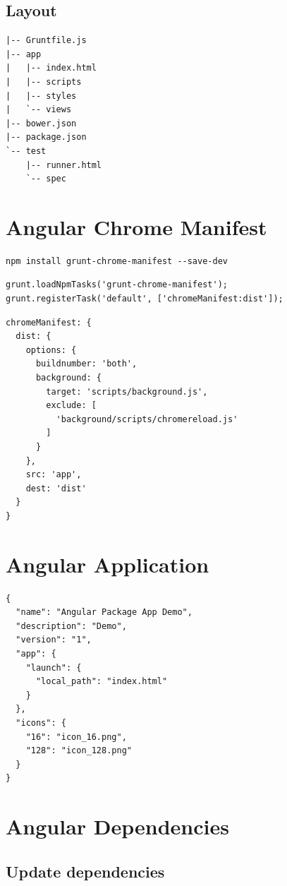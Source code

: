 \documentclass[11pt]{article}
\begin{document}
\subsection*{Layout}
\label{sec-11-2}

\begin{verbatim}
|-- Gruntfile.js
|-- app
|   |-- index.html
|   |-- scripts
|   |-- styles
|   `-- views
|-- bower.json
|-- package.json
`-- test
    |-- runner.html
    `-- spec
\end{verbatim}
\section*{Angular Chrome Manifest}
\label{sec-12}


\begin{verbatim}
npm install grunt-chrome-manifest --save-dev
\end{verbatim}

\begin{verbatim}
grunt.loadNpmTasks('grunt-chrome-manifest');
grunt.registerTask('default', ['chromeManifest:dist']);
\end{verbatim}

\begin{verbatim}
chromeManifest: {
  dist: {
    options: {
      buildnumber: 'both',
      background: {
        target: 'scripts/background.js',
        exclude: [
          'background/scripts/chromereload.js'
        ]
      }
    },
    src: 'app',
    dest: 'dist'
  }
}
\end{verbatim}
\section*{Angular Application}
\label{sec-13}

\begin{verbatim}
{
  "name": "Angular Package App Demo",
  "description": "Demo",
  "version": "1",
  "app": {
    "launch": {
      "local_path": "index.html"
    }
  },
  "icons": {
    "16": "icon_16.png",
    "128": "icon_128.png"
  }
}
\end{verbatim}
\section*{Angular Dependencies}
\label{sec-14}

\subsection*{Update dependencies}
\label{sec-14-1}
\end{document}
